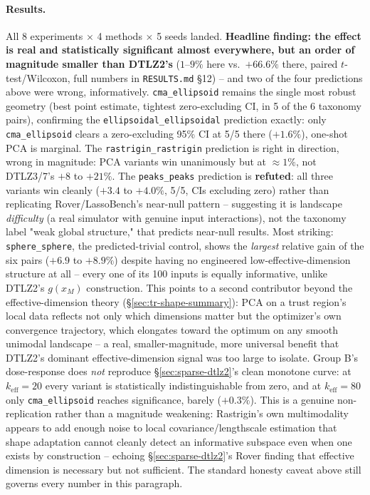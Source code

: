 \documentclass[11pt]{article}
\begin{document}
\paragraph{Results.} All 8 experiments $\times$ 4 methods $\times$ 5 seeds
landed. \textbf{Headline finding: the effect is real and statistically
significant almost everywhere, but an order of magnitude smaller than
DTLZ2's} ($1$--$9\%$ here vs.\ $+66.6\%$ there, paired $t$-test/Wilcoxon,
full numbers in \texttt{RESULTS.md} \S12) -- and two of the four
predictions above were wrong, informatively. \texttt{cma\_ellipsoid}
remains the single most robust geometry (best point estimate, tightest
zero-excluding CI, in 5 of the 6 taxonomy pairs), confirming the
\texttt{ellipsoidal\_ellipsoidal} prediction exactly: only
\texttt{cma\_ellipsoid} clears a zero-excluding 95\% CI at 5/5 there
($+1.6\%$), one-shot PCA is marginal. The \texttt{rastrigin\_rastrigin}
prediction is right in direction, wrong in magnitude: PCA variants win
unanimously but at $\approx 1\%$, not DTLZ3/7's $+8$ to $+21\%$. The
\texttt{peaks\_peaks} prediction is \textbf{refuted}: all three variants
win cleanly ($+3.4$ to $+4.0\%$, 5/5, CIs excluding zero) rather than
replicating Rover/LassoBench's near-null pattern -- suggesting it is
landscape \emph{difficulty} (a real simulator with genuine input
interactions), not the taxonomy label "weak global structure," that
predicts near-null results. Most striking: \texttt{sphere\_sphere}, the
predicted-trivial control, shows the \emph{largest} relative gain of the
six pairs ($+6.9$ to $+8.9\%$) despite having no engineered
low-effective-dimension structure at all -- every one of its 100 inputs
is equally informative, unlike DTLZ2's $g(x_M)$ construction. This points
to a second contributor beyond the effective-dimension theory
(\S\ref{sec:tr-shape-summary}): PCA on a trust region's local data
reflects not only which dimensions matter but the optimizer's own
convergence trajectory, which elongates toward the optimum on any smooth
unimodal landscape -- a real, smaller-magnitude, more universal benefit
that DTLZ2's dominant effective-dimension signal was too large to isolate.
Group B's dose-response does \emph{not} reproduce
\S\ref{sec:sparse-dtlz2}'s clean monotone curve: at $k_{\mathrm{eff}}{=}20$
every variant is statistically indistinguishable from zero, and at
$k_{\mathrm{eff}}{=}80$ only \texttt{cma\_ellipsoid} reaches significance,
barely ($+0.3\%$). This is a genuine non-replication rather than a
magnitude weakening: Rastrigin's own multimodality appears to add enough
noise to local covariance/lengthscale estimation that shape adaptation
cannot cleanly detect an informative subspace even when one exists by
construction -- echoing \S\ref{sec:sparse-dtlz2}'s Rover finding that
effective dimension is necessary but not sufficient. The standard
honesty caveat above still governs every number in this paragraph.
\end{document}
